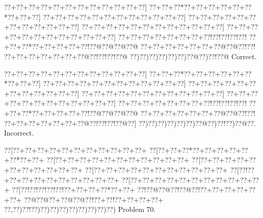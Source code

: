 \documentclass[a5paper]{article}
\begin{document}
\begin{center}
{\goo
\0??+\0??+\0??+\0??+\0??+\0??+\0??+\0??+\0??+\0??+\0??+\0??]
\0??+\0??+\0??*\0??+\0??+\0??+\0??+\0??+\0??*\0??+\0??+\0??]
\0??+\0??+\0??+\0??+\0??+\0??+\0??+\0??+\0??+\0??+\0??+\0??]
\0??+\0??+\0??+\0??+\0??+\0??+\0??+\0??+\0??+\0??+\0??+\0??]
\0??+\0??+\0??+\0??+\0??+\0??+\0??+\0??+\0??+\0??+\0??+\0??]
\0??+\0??+\0??+\0??+\0??+\0??+\0??+\0??+\0??+\0??+\0??+\0??]
\0??+\0??+\0??+\0??+\0??+\0??+\0??+\0??!\0??!\0??!\0??!\0??!
\0??+\0??+\0??*\0??+\0??+\0??+\0??+\0??!\0??@\0??@\0??@\0??@
\0??+\0??+\0??+\0??+\0??+\0??+\0??@\0??@\0??!\0??!
\0??+\0??+\0??+\0??+\0??+\0??+\0??@\0??!\0??!\0??!\0??@
\0??)\0??)\0??)\0??)\0??)\0??)\0??@\0??)\0??!\0??@
}
Correct. 

\end{center}
\begin{center}
{\goo
\0??+\0??+\0??+\0??+\0??+\0??+\0??+\0??+\0??+\0??+\0??+\0??]
\0??+\0??+\0??*\0??+\0??+\0??+\0??+\0??+\0??*\0??+\0??+\0??]
\0??+\0??+\0??+\0??+\0??+\0??+\0??+\0??+\0??+\0??+\0??+\0??]
\0??+\0??+\0??+\0??+\0??+\0??+\0??+\0??+\0??+\0??+\0??+\0??]
\0??+\0??+\0??+\0??+\0??+\0??+\0??+\0??+\0??+\0??+\0??+\0??]
\0??+\0??+\0??+\0??+\0??+\0??+\0??+\0??+\0??+\0??+\0??+\0??]
\0??+\0??+\0??+\0??+\0??+\0??+\0??+\0??!\0??!\0??!\0??!\0??!
\0??+\0??+\0??*\0??+\0??+\0??+\0??+\0??!\0??@\0??@\0??@\0??@
\0??+\0??+\0??+\0??+\0??+\0??+\0??@\0??@\0??!\0??!
\0??+\0??+\0??+\0??+\0??+\0??+\0??@\0??!\0??!\0??!\0??@\0??]
\0??)\0??)\0??)\0??)\0??)\0??)\0??@\0??)\0??!\0??)\0??@\0??.
}
Incorrect. 

\end{center}
\newpage
\begin{center}
{\goo
\0??[\0??+\0??+\0??+\0??+\0??+\0??+\0??+\0??+\0??+\0??+\0??+
\0??[\0??+\0??+\0??*\0??+\0??+\0??+\0??+\0??+\0??*\0??+\0??+
\0??[\0??+\0??+\0??+\0??+\0??+\0??+\0??+\0??+\0??+\0??+\0??+
\0??[\0??+\0??+\0??+\0??+\0??+\0??+\0??+\0??+\0??+\0??+\0??+
\0??[\0??+\0??+\0??+\0??+\0??+\0??+\0??+\0??+\0??+\0??+\0??+
\0??[\0??!\0??+\0??+\0??+\0??+\0??+\0??+\0??+\0??+\0??+\0??+
\0??[\0??+\0??+\0??+\0??+\0??+\0??+\0??+\0??+\0??+\0??+\0??+
\0??[\0??!\0??!\0??!\0??!\0??!\0??+\0??+\0??+\0??*\0??+\0??+
\0??!\0??@\0??@\0??!\0??@\0??!\0??+\0??+\0??+\0??+\0??+\0??+
\0??@\0??@\0??+\0??@\0??@\0??!\0??+\0??!\0??+\0??+\0??+\0??+
\0??,\0??)\0??!\0??)\0??)\0??)\0??)\0??)\0??)\0??)\0??)\0??)
}
Problem 70.

\end{center}
\end{document}
